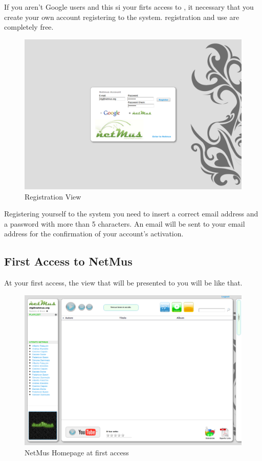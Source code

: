 If you aren't Google users and this si your firts access to , it
necessary that you create your own account registering to the system.
 registration and use are completely free. \\

\begin{figure}[htbp]
  \centering
  \includegraphics[width=15cm]{img/MU/registration.png}
\caption{Registration View}
\end{figure}


Registering yourself to the system you need to insert a correct email address
and a password with more than 5 characters. An email will be sent to your email
address for the confirmation of your account's activation.

\subsection{First Access to NetMus}

At your first access, the view that will be presented to you will be like that.

\begin{figure}[htbp]
  \centering
  \includegraphics[width=15cm]{img/MU/profile_blank.png}
\caption{NetMus Homepage at first access}
\end{figure}

